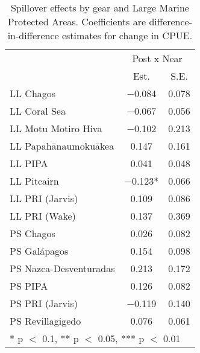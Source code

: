 \begin{table}

\caption{\label{tab:mpa_reg}Spillover effects by gear and Large Marine Protected Areas. Coefficients are
             difference-in-difference estimates for change in CPUE.}
\centering
\begin{tabular}[t]{lcc}
\toprule
\multicolumn{1}{c}{ } & \multicolumn{2}{c}{Post x Near} \\
\cmidrule(l{3pt}r{3pt}){2-3}
  & Est. & S.E.\\
\midrule
LL Chagos & \num{-0.084} & \num{0.078}\\
LL Coral Sea & \num{-0.067} & \num{0.056}\\
LL Motu Motiro Hiva & \num{-0.102} & \num{0.213}\\
LL Papahānaumokuākea & \num{0.147} & \num{0.161}\\
LL PIPA & \num{0.041} & \num{0.048}\\
LL Pitcairn & \num{-0.123}* & \num{0.066}\\
LL PRI (Jarvis) & \num{0.109} & \num{0.086}\\
LL PRI (Wake) & \num{0.137} & \num{0.369}\\
PS Chagos & \num{0.026} & \num{0.082}\\
PS Galápagos & \num{0.154} & \num{0.098}\\
PS Nazca-Desventuradas & \num{0.213} & \num{0.172}\\
PS PIPA & \num{0.126} & \num{0.082}\\
PS PRI (Jarvis) & \num{-0.119} & \num{0.140}\\
PS Revillagigedo & \num{0.076} & \num{0.061}\\
\bottomrule
\multicolumn{3}{l}{\rule{0pt}{1em}* p $<$ 0.1, ** p $<$ 0.05, *** p $<$ 0.01}\\
\end{tabular}
\end{table}
